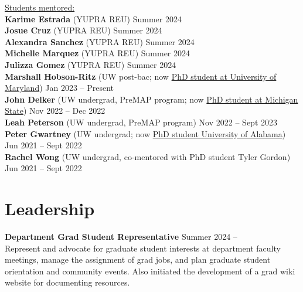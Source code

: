 \documentclass[a4,11pt]{article}
\begin{document}
\vspace{.3cm}
\underline{Students mentored:} \\
\vspace{.1cm}
\textbf{Karime Estrada} (YUPRA REU) \hfill Summer 2024 \\
\vspace{.1cm}
\textbf{Josue Cruz} (YUPRA REU) \hfill Summer 2024 \\
\vspace{.1cm}
\textbf{Alexandra Sanchez} (YUPRA REU) \hfill Summer 2024 \\
\vspace{.1cm}
\textbf{Michelle Marquez} (YUPRA REU) \hfill Summer 2024 \\
\vspace{.1cm}
\textbf{Julizza Gomez} (YUPRA REU) \hfill Summer 2024 \\
\vspace{.1cm}
\textbf{Marshall Hobson-Ritz} (UW post-bac; now \underline{PhD student at University of Maryland}) \hfill Jan 2023 -- Present \\
\vspace{.1cm}
\textbf{John Delker} (UW undergrad, PreMAP program; now \underline{PhD student at Michigan State}) \hfill Nov 2022 -- Dec 2022 \\
\vspace{.1cm}
\textbf{Leah Peterson} (UW undergrad, PreMAP program) \hfill Nov 2022 -- Sept 2023 \\
\vspace{.1cm}
\textbf{Peter Gwartney} (UW undergrad; now \underline{PhD student University of Alabama}) \hfill Jun 2021 -- Sept 2022 \\
\vspace{.1cm}
\textbf{Rachel Wong} (UW undergrad, co-mentored with PhD student Tyler Gordon) \hfill Jun 2021 -- Sept 2022 


\section{Leadership}

\textbf{Department Grad Student Representative} \hfill Summer 2024 -- \\
Represent and advocate for graduate student interests at department faculty meetings, manage the assignment of grad jobs, and plan graduate student orientation and community events. Also initiated the development of a grad wiki website for documenting resources.
\vspace{.2cm}
\end{document}
